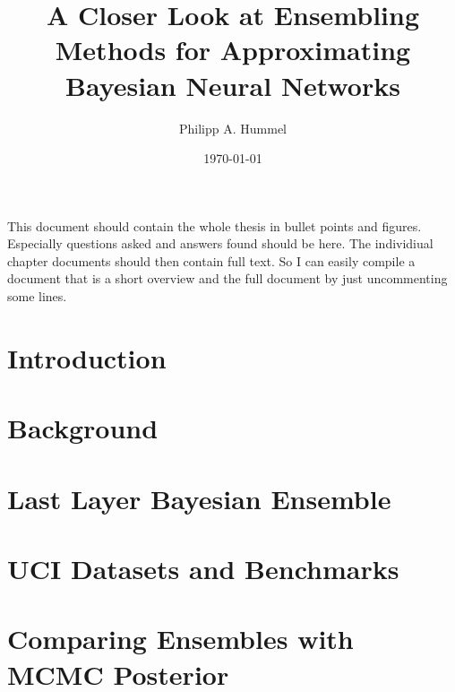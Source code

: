 \documentclass[11pt, A4, twoside]{report}
\title{A Closer Look at Ensembling Methods for Approximating Bayesian Neural Networks}
\author{Philipp A. Hummel}
\date{\today}
\begin{document}
\begin{titlepage}
\maketitle
\end{titlepage}


\begin{abstract}

\end{abstract}


\tableofcontents

\bigskip

This document should contain the whole thesis in bullet points and figures. Especially questions asked and answers found should be here. The individiual chapter documents should then contain full text. So I can easily compile a document that is a short overview and the full document by just uncommenting some lines.



\chapter{Introduction}

% 





\chapter{Background}

% 





\chapter{Last Layer Bayesian Ensemble}

% 






\chapter{UCI Datasets and Benchmarks}

% 





\chapter{Comparing Ensembles with MCMC Posterior}

% 
\end{document}
